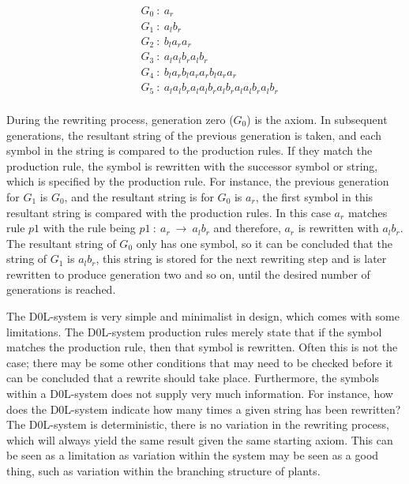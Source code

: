 \begin{equation} \label{DOL-system result string}
\begin{aligned}
	& G_0~ :~ a_r \\
	& G_1~ :~ a_l b_r \\
	& G_2~ :~ b_l a_r a_r \\
	& G_3~ :~ a_l a_l b_r a_l b_r \\
	& G_4~ :~ b_l a_r b_l a_r a_r b_l a_r a_r \\
	& G_5~ :~ a_l a_l b_r a_l a_l b_r a_l b_r a_l a_l b_r a_l b_r \\
\end{aligned}
\end{equation}

\noindent
During the rewriting process, generation zero ($G_0$) is the axiom. In subsequent generations, the resultant string of the previous generation is taken, and each symbol in the string is compared to the production rules. If they match the production rule, the symbol is rewritten with the successor symbol or string, which is specified by the production rule. For instance, the previous generation for $G_1$ is $G_0$, and the resultant string is for $G_0$ is $a_r$, the first symbol in this resultant string is compared with the production rules. In this case $a_r$ matches rule $p1$ with the rule being $p1~ :~ a_r~ \rightarrow~ a_l b_r$ and therefore, $a_r$ is rewritten with $a_l b_r$. The resultant string of $G_0$ only has one symbol, so it can be concluded that the string of $G_1$ is $a_l b_r$, this string is stored for the next rewriting step and is later rewritten to produce generation two and so on, until the desired number of generations is reached.

The D0L-system is very simple and minimalist in design, which comes with some limitations. The D0L-system production rules merely state that if the symbol matches the production rule, then that symbol is rewritten. Often this is not the case; there may be some other conditions that may need to be checked before it can be concluded that a rewrite should take place. Furthermore, the symbols within a D0L-system does not supply very much information. For instance, how does the D0L-system indicate how many times a given string has been rewritten? The D0L-system is deterministic, there is no variation in the rewriting process, which will always yield the same result given the same starting axiom. This can be seen as a limitation as variation within the system may be seen as a good thing, such as variation within the branching structure of plants. 

